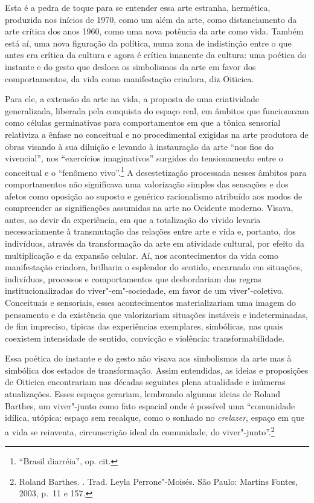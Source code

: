 Esta é a pedra de toque para se entender essa arte estranha, hermética,
produzida nos inícios de 1970, como um além da arte, como distanciamento
da arte crítica dos anos 1960, como uma nova potência da arte como vida.
Também está aí, uma nova figuração da política, numa zona de indistinção
entre o que antes era crítica da cultura e agora é crítica imanente da
cultura: uma poética do instante e do gesto que desloca os simbolismos
da arte em favor dos comportamentos, da vida como manifestação criadora,
diz Oiticica.

Para ele, a extensão da arte na vida, a proposta de uma criatividade
generalizada, liberada pela conquista do espaço real, em âmbitos que
funcionavam como células germinativas para comportamentos em que a
tônica sensorial relativiza a ênfase no conceitual e no procedimental
exigidas na arte produtora de obras visando à sua diluição e levando à
instauração da arte ``nos fios do vivencial'', nos ``exercícios
imaginativos'' surgidos do tensionamento entre o conceitual e o
``fenômeno vivo''.\footnote{``Brasil diarréia'', op. cit.} A
desestetização processada nesses âmbitos para comportamentos não
significava uma valorização simples das sensações e dos afetos como
oposição ao suposto e genérico racionalismo atribuído aos modos de
compreender as significações assumidas na arte no Ocidente moderno.
Visava, antes, ao devir da experiência, em que a totalização do vivido
levaria necessariamente à transmutação das relações entre arte e vida e,
portanto, dos indivíduos, através da transformação da arte em atividade
cultural, por efeito da multiplicação e da expansão celular. Aí, nos
acontecimentos da vida como manifestação criadora, brilharia o esplendor
do sentido, encarnado em situações, indivíduos, processos e
comportamentos que desbordariam das regras institucionalizadas do
viver"-em"-sociedade, em favor de um viver"-coletivo. Conceituais e
sensoriais, esses acontecimentos materializariam uma imagem do
pensamento e da existência que valorizariam situações instáveis e
indeterminadas, de fim impreciso, típicas das experiências exemplares,
simbólicas, nas quais coexistem intensidade de sentido, convicção e
violência: transformabilidade.

Essa poética do instante e do gesto não visava aos simbolismos da arte
mas à simbólica dos estados de transformação. Assim entendidas, as
ideias e proposições de Oiticica encontrariam nas décadas seguintes
plena atualidade e inúmeras atualizações. Esses espaços gerariam,
lembrando algumas ideias de Roland Barthes, um viver"-junto como fato
espacial onde é possível uma ``comunidade idílica, utópica: espaço sem
recalque, como o sonhado no \emph{crelazer}, espaço em que a vida se
reinventa, circunscrição ideal da comunidade, do viver"-junto''.\footnote{Roland
  Barthes. {}. Trad. Leyla Perrone"-Moisés. São
  Paulo: Martins Fontes, 2003, p.~11 e 157.}

